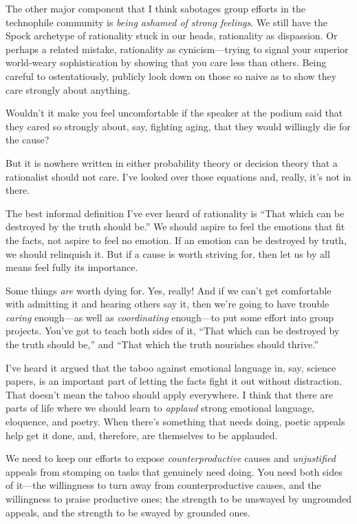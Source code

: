{
 The other major component that I think sabotages group efforts in
the technophile community is \textit{being ashamed of strong feelings}.
We still have the Spock archetype of rationality stuck in our heads,
rationality as dispassion. Or perhaps a related mistake, rationality as
cynicism---trying to signal your superior world-weary sophistication by
showing that you care less than others. Being careful to
ostentatiously, publicly look down on those so naive as to show they
care strongly about anything.}

{
 Wouldn't it make you feel uncomfortable if the
speaker at the podium said that they cared so strongly about, say,
fighting aging, that they would willingly die for the cause?}

{
 But it is nowhere written in either probability theory or decision
theory that a rationalist should not care. I've looked
over those equations and, really, it's not in there.}

{
 The best informal definition I've ever heard of
rationality is ``That which can be destroyed by the
truth should be.'' We should aspire to feel the
emotions that fit the facts, not aspire to feel no emotion. If an
emotion can be destroyed by truth, we should relinquish it. But if a
cause is worth striving for, then let us by all means feel fully its
importance.}

{
 Some things \textit{are} worth dying for. Yes, really! And if we
can't get comfortable with admitting it and hearing
others say it, then we're going to have trouble
\textit{caring} enough---as well as \textit{coordinating} enough---to
put some effort into group projects. You've got to
teach both sides of it, ``That which can be destroyed
by the truth should be,'' and ``That
which the truth nourishes should thrive.''}

{
 I've heard it argued that the taboo against
emotional language in, say, science papers, is an important part of
letting the facts fight it out without distraction. That
doesn't mean the taboo should apply everywhere. I think
that there are parts of life where we should learn to \textit{applaud}
strong emotional language, eloquence, and poetry. When
there's something that needs doing, poetic appeals help
get it done, and, therefore, are themselves to be applauded.}

{
 We need to keep our efforts to expose \textit{counterproductive}
causes and \textit{unjustified} appeals from stomping on tasks that
genuinely need doing. You need both sides of it---the willingness to
turn away from counterproductive causes, and the willingness to praise
productive ones; the strength to be unswayed by ungrounded appeals, and
the strength to be swayed by grounded ones.}

